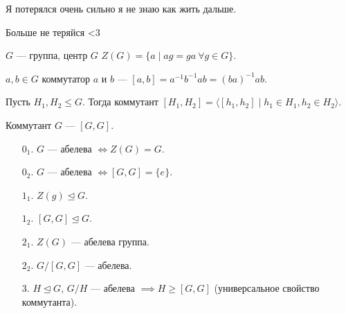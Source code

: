 Я потерялся очень сильно я не знаю как жить дальше.

Больше не теряйся <3


\begin{definition}
    $G$ --- группа, центр  $G$  $Z(G) = \{ a \mid ag = ga\ \forall g \in G\}$.
\end{definition}
\begin{definition}
    $a, b \in G$ коммутатор  $a$ и  $b$ ---  $[a, b] = a^{-1}b^{-1}ab = (ba)^{-1}ab$.
\end{definition}
\begin{definition}
    Пусть $H_1, H_2 \le G$. Тогда коммутант $[H_1, H_2] = \langle [h_1, h_2] \mid h_1 \in H_1, h_2 \in H_2\rangle$.
\end{definition}
\begin{definition}
    Коммутант $G$ --- $[G, G]$.
\end{definition}
\begin{theorem}
    \begin{enumerate}
        \item[$0_1$.] $G$ --- абелева  $\iff Z(G) = G$.
        \item[$0_2$.] $G$ --- абелева $\iff [G, G] = \{e\}$.
        \item[$1_1$.] $Z(g) \trianglelefteq G$.
        \item[$1_2$.] $[G, G] \trianglelefteq G$.
        \item[$2_1$.] $Z(G)$ --- абелева группа.
        \item[$2_2$.] $G / [G, G]$ --- абелева.
        \item[3.]  $H \trianglelefteq G$,  $G / H$ --- абелева  $\implies H \ge [G, G]$ (универсальное свойство коммутанта).
    \end{enumerate}
\end{theorem}
